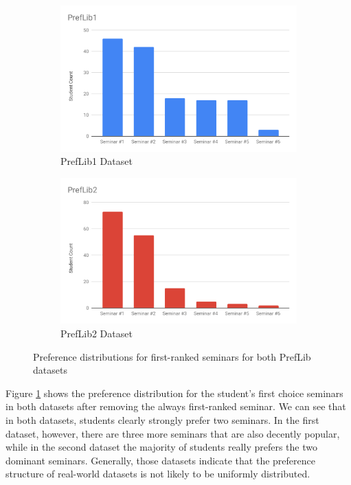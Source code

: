 \begin{figure}[h!]
  \centering
  \begin{subfigure}[b]{0.45\linewidth}
    \includegraphics[width=\linewidth]{assets/plots/preflib1-distr.pdf}
    \caption{PrefLib1 Dataset}
  \end{subfigure}
  \begin{subfigure}[b]{0.45\linewidth}
    \includegraphics[width=\linewidth]{assets/plots/preflib2-distr.pdf}
    \caption{PrefLib2 Dataset}
  \end{subfigure}
  \caption{Preference distributions for first-ranked seminars for both PrefLib datasets}
  \label{fig:preflib-distribution}
\end{figure}

Figure \ref{fig:preflib-distribution} shows the preference distribution for the student's first choice seminars in both datasets after removing the always first-ranked seminar. We can see that in both datasets, students clearly strongly prefer two seminars. In the first dataset, however, there are three more seminars that are also decently popular, while in the second dataset the majority of students really prefers the two dominant seminars. Generally, those datasets indicate that the preference structure of real-world datasets is not likely to be uniformly distributed.

